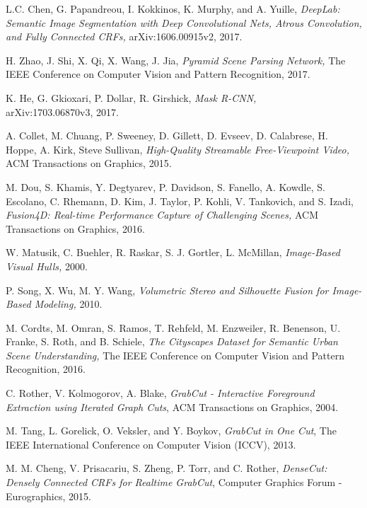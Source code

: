 \documentclass[conference]{IEEEtran}
\begin{document}
\begin{thebibliography}{1}

 L.C. Chen, G. Papandreou, I. Kokkinos, K. Murphy, and A. Yuille, \emph{DeepLab: Semantic Image Segmentation with Deep Convolutional Nets, Atrous Convolution, and Fully Connected CRFs,} arXiv:1606.00915v2, 2017. 

 H. Zhao, J. Shi, X. Qi, X. Wang, J. Jia, \emph{Pyramid Scene Parsing Network,} The IEEE Conference on Computer Vision and Pattern Recognition, 2017.

 K. He, G. Gkioxari, P. Dollar, R. Girshick, \emph{Mask R-CNN,}\\arXiv:1703.06870v3, 2017.

 A. Collet, M. Chuang, P. Sweeney, D. Gillett, D. Evseev, D. Calabrese, H. Hoppe, A. Kirk, Steve Sullivan, \emph{High-Quality Streamable Free-Viewpoint Video,} ACM Transactions on Graphics, 2015.

 M. Dou, S. Khamis, Y. Degtyarev, P. Davidson, S. Fanello, A. Kowdle, S. Escolano, C. Rhemann, D. Kim, J. Taylor, P. Kohli, V. Tankovich, and S. Izadi, \emph{Fusion4D: Real-time Performance Capture of Challenging Scenes,} ACM Transactions on Graphics, 2016.

 W. Matusik, C. Buehler, R. Raskar, S. J. Gortler, L. McMillan, \emph{Image-Based Visual Hulls,} 2000.

 P. Song, X. Wu, M. Y. Wang, \emph{Volumetric Stereo and Silhouette Fusion for Image-Based Modeling,} 2010.

 M. Cordts, M. Omran, S. Ramos, T. Rehfeld, M. Enzweiler, R. Benenson, U. Franke, S. Roth, and B. Schiele, \emph{The Cityscapes Dataset for Semantic Urban Scene Understanding,} The IEEE Conference on Computer Vision and Pattern Recognition, 2016.

 C. Rother, V. Kolmogorov, A. Blake, \emph{GrabCut - Interactive Foreground Extraction using Iterated Graph Cuts}, ACM Transactions on Graphics, 2004.

 M. Tang, L. Gorelick, O. Veksler, and Y. Boykov, \emph{GrabCut in One Cut}, The IEEE International Conference on Computer Vision (ICCV), 2013.

 M. M. Cheng, V. Prisacariu, S. Zheng, P. Torr, and C. Rother, \emph{DenseCut: Densely Connected CRFs for Realtime GrabCut}, Computer Graphics Forum - Eurographics, 2015. 


\end{thebibliography}
\end{document}
